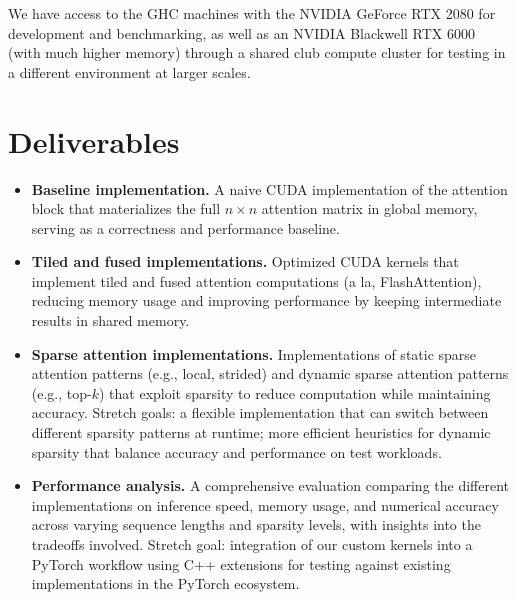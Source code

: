 \documentclass[11pt]{article}
\begin{document}
We have access to the GHC machines with the NVIDIA GeForce RTX 2080 for development and benchmarking, as well as an NVIDIA Blackwell RTX 6000 (with much higher memory) through a shared club compute cluster for testing in a different environment at larger scales.

\section*{Deliverables}
\begin{itemize}
    \item \textbf{Baseline implementation.} A naive CUDA implementation of the attention block that materializes the full $n \times n$ attention matrix in global memory, serving as a correctness and performance baseline.

    \item \textbf{Tiled and fused implementations.} Optimized CUDA kernels that implement tiled and fused attention computations (a la, FlashAttention), reducing memory usage and improving performance by keeping intermediate results in shared memory.

    \item \textbf{Sparse attention implementations.} Implementations of static sparse attention patterns (e.g., local, strided) and dynamic sparse attention patterns (e.g., top-$k$) that exploit sparsity to reduce computation while maintaining accuracy. Stretch goals: a flexible implementation that can switch between different sparsity patterns at runtime; more efficient heuristics for dynamic sparsity that balance accuracy and performance on test workloads.

    \item \textbf{Performance analysis.} A comprehensive evaluation comparing the different implementations on inference speed, memory usage, and numerical accuracy across varying sequence lengths and sparsity levels, with insights into the tradeoffs involved. Stretch goal: integration of our custom kernels into a PyTorch workflow using C++ extensions for testing against existing implementations in the PyTorch ecosystem.
    
\end{itemize}
\end{document}
